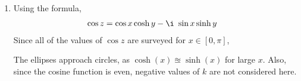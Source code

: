 \begin{enumerate}
    \item Using the formula,
          \begin{align}
              \cos z & = \cos x \cosh y - \i\ \sin x \sinh y
          \end{align}
          Since all of the values of $ \cos z $ are surveyed for $ x \in [0, \pi] $,
          \begin{figure}[H]
              \centering
          \end{figure}
          The ellipses approach circles, as $ \cosh(x) \approxeq \sinh(x) $ for
          large $ x $. Also, since the cosine function is even, negative values of
          $ k $ are not considered here.


\end{enumerate}

